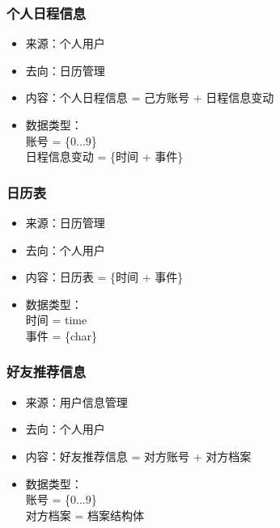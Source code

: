             \subsubsection{个人日程信息}
            \begin{itemize}
                \item 来源：个人用户
                \item 去向：日历管理
                \item 内容：个人日程信息 = 己方账号 + 日程信息变动
                \item 数据类型：\\
                账号 = \{0...9\}\\
                日程信息变动 = \{时间 + 事件\}\\
            \end{itemize}
            \subsubsection{日历表}
            \begin{itemize}
                \item 来源：日历管理
                \item 去向：个人用户
                \item 内容：日历表 = \{时间 + 事件\}
                \item 数据类型：\\
                时间 = time\\
                事件 = \{char\}\\
            \end{itemize}
            \subsubsection{好友推荐信息}
            \begin{itemize}
                \item 来源：用户信息管理
                \item 去向：个人用户
                \item 内容：好友推荐信息 = 对方账号 + 对方档案
                \item 数据类型：\\
                账号 = \{0...9\}\\
                对方档案 = 档案结构体\\
            \end{itemize}
